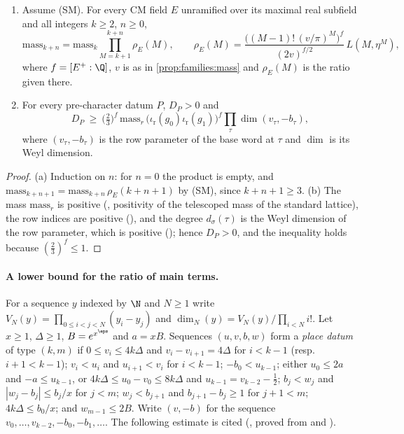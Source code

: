 \begin{lemma}\label{pf:stageU:mainterms}
\begin{enumerate}[label=(\alph*)]
\item Assume \textup{(SM)}. For every CM field $E$ unramified over its maximal real subfield and all integers $k\ge2$,
$n\ge0$,
\[
\mathrm{mass}_{k+n}=\mathrm{mass}_k\prod_{M=k+1}^{k+n}\rho_E(M),\qquad
\rho_E(M)=\frac{\bigl((M-1)!\,(v/\pi)^M\bigr)^{f}}{(2v)^{f/2}}\,L(M,\eta^M),
\]
where $f=[E^+:\Q]$, $v$ is as in \cref{prop:families:mass} and $\rho_E(M)$ is the ratio given there.
\item For every pre-character datum $P$, $D_P>0$ and
\[
D_P\ \ge\ \bigl(\tfrac23\bigr)^f\,\mathrm{mass}_r\,\bigl(\iota_{\mathrm r}(g_0)\iota_{\mathrm r}(g_1)\bigr)^f
\prod_\tau\dim(v_\tau,-b_\tau),
\]
where $(v_\tau,-b_\tau)$ is the row parameter of the base word at $\tau$ and $\dim$ is its Weyl dimension.
\end{enumerate}
\end{lemma}

\begin{proof}
(a) Induction on $n$: for $n=0$ the product is empty, and $\mathrm{mass}_{k+n+1}=\mathrm{mass}_{k+n}\,\rho_E(k+n+1)$ by (SM), since
$k+n+1\ge3$. (b) The mass $\mathrm{mass}_r$ is positive (,
positivity of the telescoped mass of the standard lattice), the row indices are positive
(), and the degree $d_\sigma(\tau)$ is the Weyl dimension of the row
parameter, which is positive (); hence $D_P>0$, and the inequality
holds because $(\frac23)^f\le1$.
\end{proof}

\paragraph{A lower bound for the ratio of main terms.}
For a sequence $y$ indexed by $\N$ and $N\ge1$ write $V_N(y)=\prod_{0\le i<j<N}(y_i-y_j)$ and
$\dim_N(y)=V_N(y)/\prod_{i<N}i!$. Let $x\ge1$, $\Delta\ge1$, $B=e^{x^\eps}$ and $a=xB$. Sequences $(u,v,b,w)$ form a
\emph{place datum} of type $(k,m)$ if $0\le v_i\le4k\Delta$ and $v_i-v_{i+1}=4\Delta$ for $i<k-1$ (resp.\ $i+1<k-1$);
$v_i<u_i$ and $u_{i+1}<v_i$ for $i<k-1$; $-b_0<u_{k-1}$; either $u_0\le2a$ and $-a\le u_{k-1}$, or
$4k\Delta\le u_0-v_0\le8k\Delta$ and $u_{k-1}=v_{k-2}-\frac12$; $b_j<w_j$ and $|w_j-b_j|\le b_j/x$ for $j<m$; $w_j<b_{j+1}$
and $b_{j+1}-b_j\ge1$ for $j+1<m$; $4k\Delta\le b_0/x$; and $w_{m-1}\le2B$. Write $(v,-b)$ for the sequence
$v_0,\dots,v_{k-2},-b_0,-b_1,\dots$. The following estimate is cited
(, proved from
 and
).

